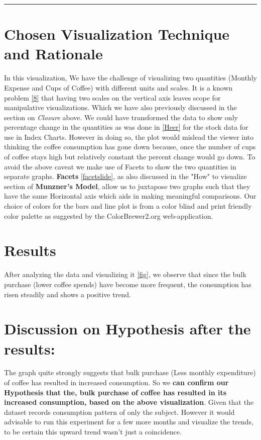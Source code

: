 \documentclass[a4paper,11pt]{article}
\begin{document}
\hrule
\pagebreak
\begin{multicols}{2}
\section*{Chosen Visualization Technique and Rationale}
In this visualization, We have the challenge of visualizing two quantities (Monthly Expense and Cups of Coffee) with different units and scales. It is a known problem \ref{8} that having two scales on the vertical axis leaves scope for manipulative visualizations. Which we have also previously discussed in the section on \textit{Closure} above. 
We could have transformed the data to show only percentage change in the quantities as was done in \ref{Heer} for the stock data for use in Index Charts. However in doing so, the plot would mislead the viewer into thinking the coffee consumption has gone down because, once the number of cups of coffee stays high but relatively constant the percent change would go down. To avoid the above caveat we make use of Facets to show the two quantities in separate graphs. \textbf{Facets} \ref{facetslide}, as also discussed in the "How" to visualize section of \textbf{Munzner's Model},  allow us to juxtapose two graphs such that they have the same Horizontal axis which aids in making meaningful comparisons.
Our choice of colors for the bars and line plot is from a color blind and print friendly color palette  as suggested by the ColorBrewer2.org web-application.
\section*{Results}
After analyzing the data and visualizing it \ref{fig}, we observe that since the bulk purchase (lower coffee spends) have become more frequent, the consumption has risen steadily and shows a positive trend.
\section*{Discussion on Hypothesis after the results: }
The graph quite strongly suggests that bulk purchase (Less monthly expenditure) of coffee has resulted in increased consumption. So we \textbf{can confirm our Hypothesis that the, bulk purchase of coffee has resulted in its increased consumption, based on the above visualization}. Given that the dataset records consumption pattern of only the subject. However it would advisable to run this experiment for a few more months and visualize the trends, to be certain this upward trend wasn't just a coincidence.\\
\vfill

\end{multicols}
\end{document}
